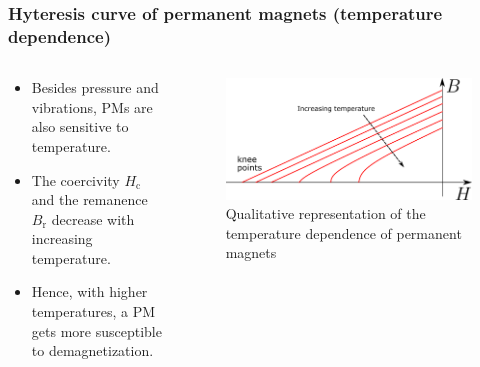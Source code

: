 \begin{frame}
	\frametitle{Hyteresis curve of permanent magnets (temperature dependence)}
	\begin{columns}
		\begin{column}{0.4\textwidth}
            \begin{itemize}
                \item Besides pressure and vibrations, PMs are also sensitive to temperature.
                \item The coercivity $H_\mathrm{c}$ and the remanence $B_\mathrm{r}$ decrease with increasing temperature.
                \item Hence, with higher temperatures, a PM gets more susceptible to demagnetization.
            \end{itemize}
		\end{column}
        \hspace{0.25cm}
		\begin{column}{0.4\textwidth}
			\begin{figure}
				\centering
				\includegraphics[height=0.4\textheight]{fig/lec02/Hyteresis_curve_PM_temperature.pdf}
				\caption{Qualitative representation of the temperature dependence of permanent magnets}
			\end{figure}
		\end{column}
		\end{columns}
\end{frame}


